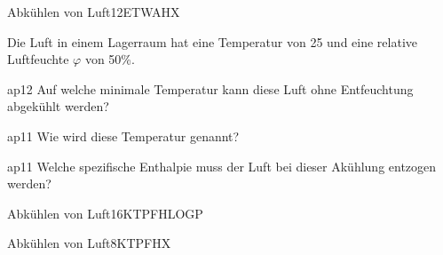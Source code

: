 \documentclass[bsz-mkk-exam,ka]{teacher}
\begin{document}



\begin{examaufgabe}[T]{Abkühlen von Luft}{12}{ET}{WA}{HX}
   \begin{textonly}
     Die Luft in einem Lagerraum hat eine Temperatur von
     \unit{25}{\celsius} und eine relative Luftfeuchte $\varphi$ von
     \unit{50}{\%}.
   \end{textonly}
   \begin{teilaufgabe}{ap}{1}{2}
     Auf welche minimale Temperatur kann diese Luft ohne Entfeuchtung
     abgekühlt werden?
   \end{teilaufgabe}
   \begin{loesung}
   \end{loesung}
   \begin{teilaufgabe}{ap}{1}{1}
      Wie wird diese Temperatur genannt?
   \end{teilaufgabe}
   \begin{loesung}
   \end{loesung}
   \begin{teilaufgabe}{ap}{1}{1}
     Welche spezifische Enthalpie muss der Luft bei dieser Akühlung
     entzogen werden?
   \end{teilaufgabe}
   \begin{loesung}
   \end{loesung}
\end{examaufgabe}

\begin{examaufgabe}[T]{Abkühlen von Luft}{16}{KT}{PF}{HLOGP}
\end{examaufgabe}

\begin{examaufgabe}[T]{Abkühlen von Luft}{8}{KT}{PF}{HX}
\end{examaufgabe}
\end{document}
